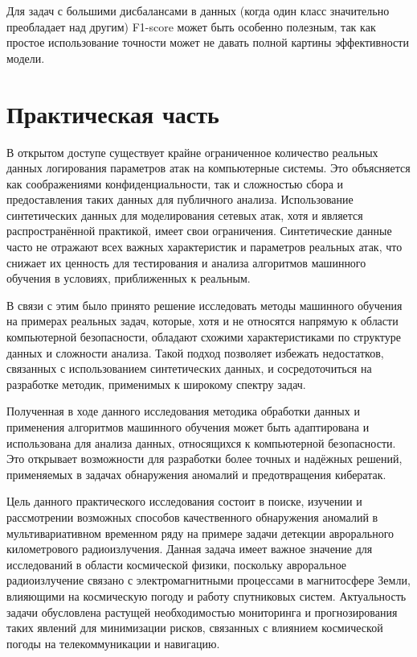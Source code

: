 \documentclass[spec, och, diploma]{SCWorks}
\begin{document}
        Для задач с большими дисбалансами в данных (когда один класс значительно
        преобладает над другим) F1-score может быть особенно полезным, так как
        простое использование точности может не давать полной картины
        эффективности модели.

\section{Практическая часть}

    В открытом доступе существует крайне ограниченное количество реальных данных
    логирования параметров атак на компьютерные системы. Это объясняется как
    соображениями конфиденциальности, так и сложностью сбора и предоставления
    таких данных для публичного анализа. Использование синтетических данных для
    моделирования сетевых атак, хотя и является распространённой практикой,
    имеет свои ограничения. Синтетические данные часто не отражают всех важных
    характеристик и параметров реальных атак, что снижает их ценность для
    тестирования и анализа алгоритмов машинного обучения в условиях,
    приближенных к реальным.

    В связи с этим было принято решение исследовать методы машинного обучения на
    примерах реальных задач, которые, хотя и не относятся напрямую к области
    компьютерной безопасности, обладают схожими характеристиками по структуре
    данных и сложности анализа. Такой подход позволяет избежать недостатков,
    связанных с использованием синтетических данных, и сосредоточиться на
    разработке методик, применимых к широкому спектру задач.

    Полученная в ходе данного исследования методика обработки данных и
    применения алгоритмов машинного обучения может быть адаптирована и
    использована для анализа данных, относящихся к компьютерной безопасности.
    Это открывает возможности для разработки более точных и надёжных решений,
    применяемых в задачах обнаружения аномалий и предотвращения кибератак.

    Цель данного практического исследования состоит в поиске, изучении и
    рассмотрении возможных способов качественного обнаружения аномалий в
    мультивариативном временном ряду на примере задачи детекции аврорального
    километрового радиоизлучения. Данная задача имеет важное значение для
    исследований в области космической физики, поскольку авроральное
    радиоизлучение связано с электромагнитными процессами в магнитосфере Земли,
    влияющими на космическую погоду и работу спутниковых систем. Актуальность
    задачи обусловлена растущей необходимостью мониторинга и прогнозирования
    таких явлений для минимизации рисков, связанных с влиянием космической
    погоды на телекоммуникации и навигацию.
\end{document}
